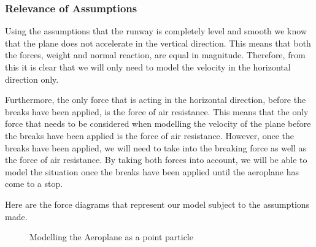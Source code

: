 \subsubsection{Relevance of Assumptions}
Using the assumptions that the runway is completely level and smooth we know that the plane does not accelerate in the vertical direction. This means that both the forces, weight and normal reaction, are equal in magnitude. Therefore, from this it is clear that we will only need to model the velocity in the horizontal direction only.

Furthermore, the only force that is acting in the horizontal direction, before the breaks have been applied, is the force of air resistance. This means that the only force that needs to be considered when modelling the velocity of the plane before the breaks have been applied is the force of air resistance. However, once the breaks have been applied, we will need to take into the breaking force as well as the force of air resistance. By taking both forces into account, we will be able to model the situation once the breaks have been applied until the aeroplane has come to a stop.

Here are the force diagrams that represent our model subject to the assumptions made.

\begin{figure}[H]
    \centering
    \qquad
    \caption{Modelling the Aeroplane as a point particle}
    \label{fig:example}
\end{figure}